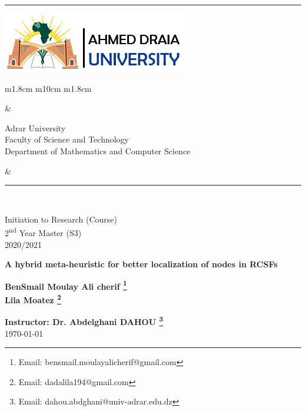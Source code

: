 \documentclass[paper=a4, fontsize=11pt]{scrartcl}
\numberwithin{equation}{section}		%
\numberwithin{figure}{section}			%
\numberwithin{table}{section}				%
\newcommand{\horrule}[1]{\rule{\linewidth}{#1}} 	%
\begin{document}
		
{\flushleft\horrule{2pt}
\begin{center}
{\includegraphics[height=0.09\textwidth]{Figs/logo_english.png}} 
\begin{tabular}{ m{1.8cm} m{10cm} m{1.8cm}}
\begin{center}
\end{center}
&
\begin{center} 
{\small
{Adrar University} \\
{Faculty of Science and Technology} \\
{Department of Mathematics and Computer Science}} \\

\end{center}
&

\begin{center}
\end{center}
\end{tabular}
\end{center}
\flushleft \horrule{2pt}\\[1cm]
}


\begin{center}

{
\huge  
Initiation to Research (Course) \\
\vspace{0.2cm}
2\textsuperscript{nd} Year Master (S3) \\
\vspace{0.2cm}
2020/2021}\\

\vspace{1cm}

{
\Huge   
\textbf{A hybrid meta-heuristic for better localization of nodes in RCSFs }}\\
\vspace{1cm}

{
\Large
\textbf{BenSmail Moulay Ali cherif \footnote{Email: 	bensmail.moulayalicherif@gmail.com} \\ Lila Moatez \footnote{Email: dadalila194@gmail.com}}}\\
\vspace{3cm}

{
\large
\textbf{Instructor: Dr. Abdelghani DAHOU \footnote{Email: dahou.abdghani@univ-adrar.edu.dz}}}\\
\today
\end{center}
\pagebreak
\tableofcontents
\pagebreak
\listoffigures
\pagebreak
\listoftables
\pagebreak
\end{document}
